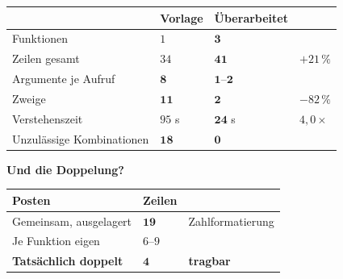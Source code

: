 \begin{merksatz}
\begin{center}
{\small
\renewcommand{\arraystretch}{1.45}
\begin{tabular}{@{}P{2.8cm}P{2.0cm}P{2.2cm}P{2.0cm}@{}}
\toprule
& \textbf{Vorlage} & \textbf{Überarbeitet} & \\
\midrule
Funktionen & $1$ & $\mathbf{3}$ & \\
Zeilen gesamt & $34$ & $\mathbf{41}$ & $+21\,\%$\\
Argumente je Aufruf & $\mathbf{8}$ & $\mathbf{1}$--$\mathbf{2}$ & \\
Zweige & $\mathbf{11}$ & $\mathbf{2}$ & $-82\,\%$\\
Verstehenszeit & $95$ s & $\mathbf{24}$ s & $4{,}0\times$\\
Unzulässige Kombinationen & \textcolor{akzent}{$\mathbf{18}$} & \textcolor{gruen}{$\mathbf{0}$} & \\
\bottomrule
\end{tabular}}
\end{center}

\begin{center}
\begin{minipage}{0.88\textwidth}
\end{minipage}
\end{center}

\textbf{Und die Doppelung?}

\begin{center}
\renewcommand{\arraystretch}{1.45}
\begin{tabular}{@{}P{3.0cm}P{2.2cm}P{2.6cm}@{}}
\toprule
\textbf{Posten} & \textbf{Zeilen} & \\
\midrule
Gemeinsam, ausgelagert & $\mathbf{19}$ & \textcolor{gruen}{Zahl\-formatierung}\\
Je Funktion eigen & $6$--$9$ & \\
\textbf{Tatsächlich doppelt} & $\mathbf{4}$ & \textcolor{gruen}{\textbf{tragbar}}\\
\bottomrule
\end{tabular}
\end{center}

\begin{center}
\end{center}
\end{merksatz}


